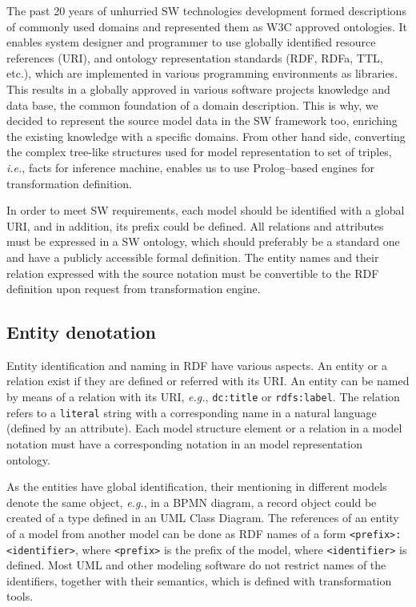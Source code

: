 \documentclass[conference]{IEEEtran}
\begin{document}
The past 20 years of unhurried SW technologies development formed descriptions of commonly used domains and represented them as W3C approved ontologies.  It enables system designer and programmer to use globally identified resource references (URI), and ontology representation standards (RDF, RDFa, TTL, etc.), which are implemented in various programming environments as libraries.  This results in a globally approved in various software projects knowledge and data base, the common foundation of a domain description.  This is why, we decided to represent the source model data in the SW framework too, enriching the existing knowledge with a specific domains.  From other hand side, converting the complex tree-like structures used for model representation to set of triples, \emph{i.e.}, facts for inference machine, enables us to use Prolog--based engines for transformation definition.

In order to meet SW requirements, each model should be identified with a global URI, and in addition, its prefix could be defined.  All relations and attributes must be expressed in a SW ontology, which should preferably be a standard one and have a publicly accessible formal definition.  The entity names and their relation expressed with the source notation must be convertible to the RDF definition upon request from transformation engine.

\subsection{Entity denotation}
\label{sec:ent-def}

Entity identification and naming in RDF have various aspects.  An entity or a relation exist if they are defined or referred with its URI.  An entity can be named by means of a relation with its URI, \emph{e.g.}, \texttt{dc:title} or \texttt{rdfs:label}.  The relation refers to a \texttt{literal} string with a corresponding name in a natural language (defined by an attribute).  Each model structure element or a relation in a model notation must have a corresponding notation in an model representation ontology.

As the entities have global identification, their mentioning in different models denote the same object, \emph{e.g.}, in a BPMN diagram, a record object could be created of a type defined in an UML Class Diagram.  The references of an entity of a model from another model can be done as RDF names of a form \texttt{<prefix>:<identifier>}, where \texttt{<prefix>} is the prefix of the model, where \texttt{<identifier>} is defined.  Most UML and other modeling software do not restrict names of the identifiers, together with their semantics, which is defined with transformation tools.
\end{document}
